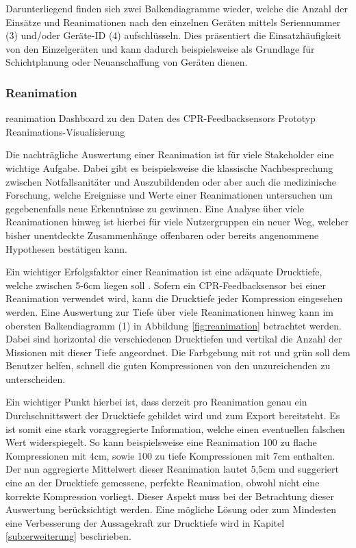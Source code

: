 Darunterliegend finden sich zwei Balkendiagramme wieder, welche die Anzahl der Einsätze und Reanimationen nach den einzelnen Geräten mittels Seriennummer (3) und/oder Geräte-ID (4) aufschlüsseln.
Dies präsentiert die Einsatzhäufigkeit von den Einzelgeräten und kann dadurch beispielsweise als Grundlage für Schichtplanung oder Neuanschaffung von Geräten dienen.

\subsubsection{Reanimation}
\label{subsub:reanimation}
\bildbreit
{reanimation}
{Dashboard zu den Daten des \gls{CPR-Feedbacksensor}s}
{Prototyp Reanimations-Visualisierung}

Die nachträgliche Auswertung einer Reanimation ist für viele Stakeholder eine wichtige Aufgabe.
Dabei gibt es beispielsweise die klassische Nachbesprechung zwischen Notfallsanitäter und Auszubildenden oder aber auch die medizinische Forschung, welche Ereignisse und Werte einer Reanimationen untersuchen um gegebenenfalls neue Erkenntnisse zu gewinnen.
Eine Analyse über viele Reanimationen hinweg ist hierbei für viele Nutzergruppen ein neuer Weg, welcher bisher unentdeckte Zusammenhänge offenbaren oder bereits angenommene Hypothesen bestätigen kann.

Ein wichtiger Erfolgsfaktor einer Reanimation ist eine adäquate Drucktiefe, welche zwischen 5-6cm liegen soll  \cite{Monsieurs.2015}.
Sofern ein \gls{CPR-Feedbacksensor} bei einer Reanimation verwendet wird, kann die Drucktiefe jeder Kompression eingesehen werden. %
Eine Auswertung zur Tiefe über viele Reanimationen hinweg kann im obersten Balkendiagramm (1) in Abbildung \ref{fig:reanimation} betrachtet werden.
Dabei sind horizontal die verschiedenen Drucktiefen und vertikal die Anzahl der Missionen mit dieser Tiefe angeordnet.
Die Farbgebung mit rot und grün soll dem Benutzer helfen, schnell die \glqq guten\grqq{} Kompressionen von den unzureichenden zu unterscheiden.

Ein wichtiger Punkt hierbei ist, dass derzeit pro Reanimation genau ein Durchschnittswert der Drucktiefe gebildet wird und zum Export bereitsteht.
Es ist somit eine stark voraggregierte Information, welche einen eventuellen falschen Wert widerspiegelt. 
So kann beispielsweise eine Reanimation 100 zu flache Kompressionen mit 4cm, sowie 100 zu tiefe Kompressionen  mit 7cm enthalten.
Der nun aggregierte Mittelwert dieser Reanimation lautet 5,5cm und suggeriert eine an der Drucktiefe gemessene, \glqq perfekte\grqq{} Reanimation, obwohl nicht eine korrekte Kompression vorliegt.
Dieser Aspekt muss bei der Betrachtung dieser Auswertung berücksichtigt werden.
Eine mögliche Lösung oder zum Mindesten eine Verbesserung der Aussagekraft zur Drucktiefe wird in Kapitel \ref{sub:erweiterung} beschrieben.

